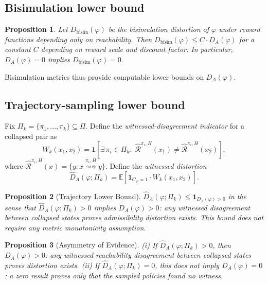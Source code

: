 \documentclass[10pt,twocolumn]{article}
\theoremstyle{plain}
\newtheorem{proposition}{Proposition}
\theoremstyle{definition}
\theoremstyle{remark}
\newcommand{\DA}{D_{A}(\varphi)}
\begin{document}
\subsection{Bisimulation lower bound}

\begin{proposition}
\label{prop:bisim_bound}
Let $D_{\mathrm{bisim}}(\varphi)$ be the bisimulation distortion of $\varphi$
under reward functions depending only on reachability. Then
$D_{\mathrm{bisim}}(\varphi)\leq C\cdot\DA$ for a constant $C$ depending on
reward scale and discount factor. In particular, $\DA=0$ implies
$D_{\mathrm{bisim}}(\varphi)=0$.
\end{proposition}

Bisimulation metrics \citep{ferns2004metrics,kemertas2021towards} thus provide
computable lower bounds on $\DA$.

\subsection{Trajectory-sampling lower bound}

Fix $\Pi_k=\{\pi_1,\ldots,\pi_k\}\subseteq\Pi$. Define the
\emph{witnessed-disagreement indicator} for a collapsed pair as
\[
  W_k(x_1,x_2) = \mathbf{1}\!\left[\exists\,\pi_i\in\Pi_k :\;
    \hat{\mathcal{R}}^{\pi_i,H}(x_1)\neq\hat{\mathcal{R}}^{\pi_i,H}(x_2)
  \right],
\]
where $\hat{\mathcal{R}}^{\pi_i,H}(x)=\{y:x\overset{\pi_i,H}{\rightsquigarrow}y\}$.
Define the \emph{witnessed distortion}
\[
  \hat{D}_A(\varphi;\Pi_k) = \mathbb{E}\!\left[
    \mathbf{1}_{C_\varphi=1}\cdot W_k(x_1,x_2)
  \right].
\]

\begin{proposition}[Trajectory Lower Bound]
\label{prop:lower_bound}
$\hat{D}_A(\varphi;\Pi_k)\leq \mathbf{1}_{D_A(\varphi)>0}$ in the sense that
$\hat{D}_A(\varphi;\Pi_k)>0$ implies $\DA>0$: any witnessed disagreement between
collapsed states proves admissibility distortion exists. This bound does not
require any metric monotonicity assumption.
\end{proposition}

\begin{proposition}[Asymmetry of Evidence]
\label{prop:asymmetry}
(i) If $\hat{D}_A(\varphi;\Pi_k)>0$, then $\DA>0$: any witnessed reachability
disagreement between collapsed states \emph{proves} distortion exists. (ii) If
$\hat{D}_A(\varphi;\Pi_k)=0$, this does not imply $\DA=0$: a zero result proves
only that the sampled policies found no witness.
\end{proposition}
\end{document}
